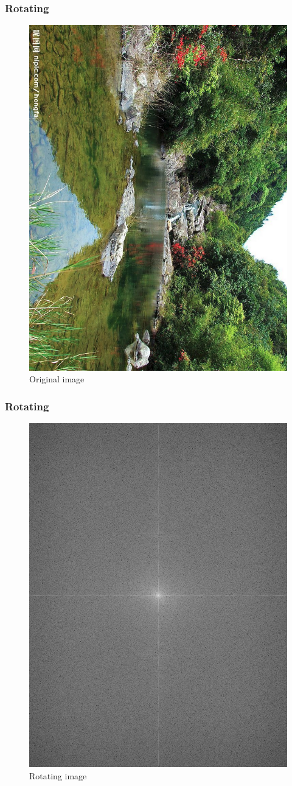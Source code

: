 \documentclass[notheorems, serif, table, compress]{beamer}  %
\begin{document}
\begin{frame}
\frametitle{Rotating}
\begin{figure}
 \centering
 \caption{Original image}
 \includegraphics[width=0.5\linewidth]{rotateor.png} 
 \end{figure}
 \end{frame}

\begin{frame}
\frametitle{Rotating}
\begin{figure}
 \centering
 \caption{Rotating image}
 \includegraphics[width=0.5\linewidth]{rotate.png} 
 \end{figure}
 \end{frame}
\end{document}
